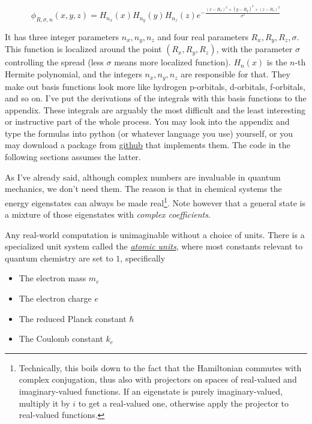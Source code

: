 \documentclass{article}
\newcommand{\githubrepo}{https://github.com/lisyarus/chembook}
\begin{document}
\begin{equation}
\phi_{R,\sigma,n}(x,y,z) = H_{n_x}(x)H_{n_y}(y)H_{n_z}(z) e^{-\frac{(x-R_x)^2+(y-R_y)^2+(z-R_z)^2}{\sigma^2}}
\end{equation}

It has three integer parameters \(n_x,n_y,n_z\) and four real parameters \(R_x,R_y,R_z,\sigma\). This function is localized around the point \((R_x,R_y,R_z)\), with the parameter \(\sigma\) controlling the spread (less \(\sigma\) means more localized function). \(H_n(x)\) is the \(n\)-th Hermite polynomial, and the integers \(n_x,n_y,n_z\) are responsible for that. They make out basis functions look more like hydrogen p-orbitals, d-orbitals, f-orbitals, and so on. I've put the derivations of the integrals with this basis functions to the appendix. These integrals are arguably the most difficult and the least interesting or instructive part of the whole process. You may look into the appendix and type the formulas into python (or whatever language you use) yourself, or you may download a package from \href{\githubrepo/blob/master/code/hgto.py}{github} that implements them. The code in the following sections assumes the latter.

As I've already said, although complex numbers are invaluable in quantum mechanics, we don't need them. The reason is that in chemical systems the energy eigenstates can always be made real\footnote{Technically, this boils down to the fact that the Hamiltonian commutes with complex conjugation, thus also with projectors on spaces of real-valued and imaginary-valued functions. If an eigenstate is purely imaginary-valued, multiply it by \(i\) to get a real-valued one, otherwise apply the projector to real-valued functions.}. Note however that a general state is a mixture of those eigenstates with \textit{complex coefficients}.

Any real-world computation is unimaginable without a choice of units. There is a specialized unit system called the \href{https://en.wikipedia.org/wiki/Hartree_atomic_units}{\textit{atomic units}}, where most constants relevant to quantum chemistry are set to \(1\), specifically

\begin{itemize}
\item The electron mass \(m_e\)
\item The electron charge \(e\)
\item The reduced Planck constant \(\hbar\)
\item The Coulomb constant \(k_e\)
\end{itemize}
\end{document}
